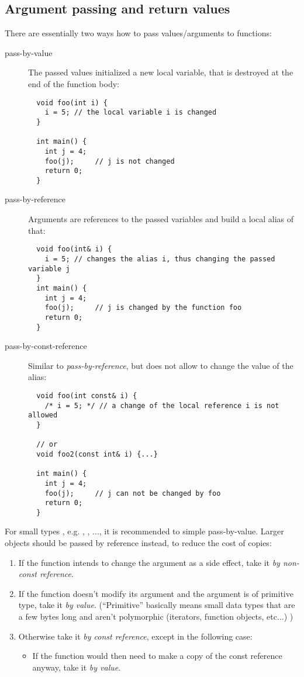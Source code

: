 \subsection{Argument passing and return values\label{sec:function-arguments}}
There are essentially two ways how to pass values/arguments to functions:
\begin{description}
  \item[pass-by-value] The passed values initialized a new local variable, that is destroyed at the end of the function body:
  \begin{verbatim}
  void foo(int i) {
    i = 5; // the local variable i is changed
  }

  int main() {
    int j = 4;
    foo(j);     // j is not changed
    return 0;
  }
  \end{verbatim}

  \item[pass-by-reference] Arguments are references to the passed variables and build a local alias of that:
  \begin{verbatim}
  void foo(int& i) {
    i = 5; // changes the alias i, thus changing the passed variable j
  }
  int main() {
    int j = 4;
    foo(j);     // j is changed by the function foo
    return 0;
  }
  \end{verbatim}

  \item[pass-by-const-reference] Similar to \emph{pass-by-reference}, but does not allow to change the value of the alias:
  \begin{verbatim}
  void foo(int const& i) {
    /* i = 5; */ // a change of the local reference i is not allowed
  }

  // or
  void foo2(const int& i) {...}

  int main() {
    int j = 4;
    foo(j);     // j can not be changed by foo
    return 0;
  }
  \end{verbatim}
\end{description}

\begin{rem}
  For small types , e.g. , , ..., it is recommended to simple pass-by-value. Larger objects should be passed by
  reference instead, to reduce the cost of copies:
  \begin{enumerate}[1)]
  \item If the function intends to change the argument as a side effect, take it \emph{by non-const reference}.
  \item If the function doesn't modify its argument and the argument is of primitive type, take it \emph{by value}. (``Primitive'' basically means
  small data types that are a few bytes long and aren't polymorphic (iterators, function objects, etc...) )
  \item Otherwise take it \emph{by const reference}, except in the following case:\begin{itemize}
        \item If the function would then need to make a copy of the const reference anyway, take it \emph{by value}.
  \end{itemize}
  \end{enumerate}
\end{rem}

